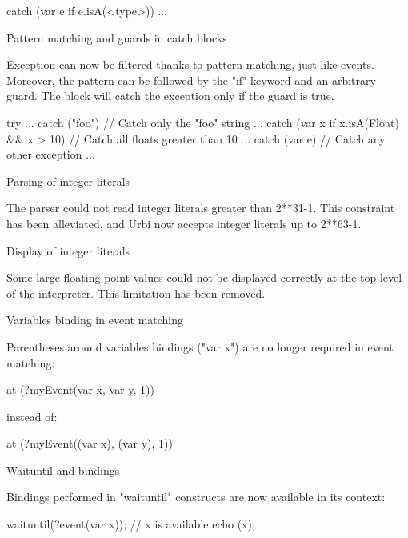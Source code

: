 \begin{description}
\begin{urbiunchecked}
catch (var e if e.isA(<type>))
{
  ...
}
\end{urbiunchecked}

\item Pattern matching and guards in catch blocks

  Exception can now be filtered thanks to pattern matching, just like
  events. Moreover, the pattern can be followed by the "if" keyword and an
  arbitrary guard. The block will catch the exception only if the guard is
  true.

\begin{urbiunchecked}
try
{ ... }
catch ("foo") // Catch only the "foo" string
{ ... }
catch (var x if x.isA(Float) && x > 10) // Catch all floats greater than 10
{ ... }
catch (var e)  // Catch any other exception
{ ... }
\end{urbiunchecked}

\item Parsing of integer literals

  The parser could not read integer literals greater than 2**31-1.  This
  constraint has been alleviated, and Urbi now accepts integer literals up
  to 2**63-1.

\item Display of integer literals

  Some large floating point values could not be displayed correctly at the
  top level of the interpreter. This limitation has been removed.

\item Variables binding in event matching

  Parentheses around variables bindings ("var x") are no longer required in
  event matching:

\begin{urbiunchecked}
at (?myEvent(var x, var y, 1))
\end{urbiunchecked}

\noindent
instead of:

\begin{urbiunchecked}
at (?myEvent((var x), (var y), 1))
\end{urbiunchecked}

\item Waituntil and bindings

  Bindings performed in "waituntil" constructs are now available in its
  context:

\begin{urbiunchecked}
waituntil(?event(var x));
// x is available
echo (x);
\end{urbiunchecked}


\end{description}

